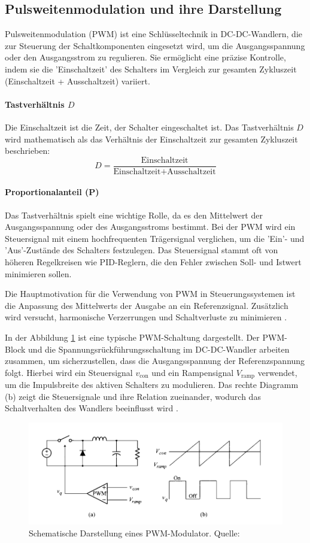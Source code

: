 

\subsection{Pulsweitenmodulation und ihre Darstellung}
\label{sec:PWM_Grundlagen}
Pulsweitenmodulation (PWM) ist eine Schlüsseltechnik in DC-DC-Wandlern, die zur Steuerung der Schaltkomponenten eingesetzt wird, um die Ausgangsspannung oder den Ausgangsstrom zu regulieren. Sie ermöglicht eine präzise Kontrolle, indem sie die 'Einschaltzeit' des Schalters im Vergleich zur gesamten Zykluszeit (Einschaltzeit + Ausschaltzeit) variiert.\cite{peddapelli2017pulse}

\paragraph{Tastverhältnis \(D\)}
Die Einschaltzeit ist die Zeit, der Schalter eingeschaltet ist. Das Tastverhältnis \( D \) wird mathematisch als das Verhältnis der Einschaltzeit zur gesamten Zykluszeit beschrieben:
\begin{equation}
D = \frac{\text{Einschaltzeit}}{\text{Einschaltzeit} + \text{Ausschaltzeit}}
\end{equation}

\paragraph{Proportionalanteil (P)}
Das Tastverhältnis spielt eine wichtige Rolle, da es den Mittelwert der Ausgangsspannung oder des Ausgangsstroms bestimmt. Bei der PWM wird ein Steuersignal mit einem hochfrequenten Trägersignal verglichen, um die 'Ein'- und 'Aus'-Zustände des Schalters festzulegen. Das Steuersignal stammt oft von höheren Regelkreisen wie PID-Reglern, die den Fehler zwischen Soll- und Istwert minimieren sollen.

Die Hauptmotivation für die Verwendung von PWM in Steuerungssystemen ist die Anpassung des Mittelwerts der Ausgabe an ein Referenzsignal. Zusätzlich wird versucht, harmonische Verzerrungen und Schaltverluste zu minimieren \cite{peddapelli2017pulse}.

In der Abbildung \ref{fig:PWM_converter} ist eine typische PWM-Schaltung dargestellt. Der PWM-Block und die Spannungsrückführungsschaltung im DC-DC-Wandler arbeiten zusammen, um sicherzustellen, dass die Ausgangsspannung der Referenzspannung folgt. Hierbei wird ein Steuersignal \(v_{\text{con}}\) und ein Rampensignal \(V_{\text{ramp}}\) verwendet, um die Impulsbreite des aktiven Schalters zu modulieren. Das rechte Diagramm (b) zeigt die Steuersignale und ihre Relation zueinander, wodurch das Schaltverhalten des Wandlers beeinflusst wird \cite{choi2013pulsewidth}.



\begin{figure}[htbp]
    \centering
    \includegraphics[width=0.8\linewidth]{2Grundlagen/141PWM.png}
    \caption{Schematische Darstellung eines PWM-Modulator. Quelle: \cite{choi2013pulsewidth}}
    \label{fig:PWM_converter}
\end{figure}
